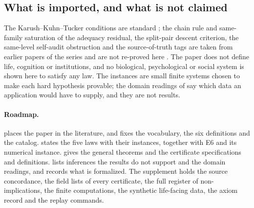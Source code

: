 \subsection{What is imported, and what is not claimed}\label{sec:intro-claims}

The Karush--Kuhn--Tucker conditions are standard \citep{BoydVandenberghe2004}; the chain rule and
same-family saturation of the adequacy residual, the split-pair descent criterion, the same-level
self-audit obstruction and the source-of-truth tags are taken from earlier papers of the series and
are not re-proved here \citep{Tsiokos2026Adequacy,Tsiokos2026FoundIV,Tsiokos2026FoundIII}. The
paper does not define life, cognition or institutions, and no biological, psychological or social
system is shown here to satisfy any law. The instances are small finite systems chosen to make each
hard hypothesis provable; the domain readings of  say which data an application
would have to supply, and they are not results.

\paragraph{Roadmap.}  places the paper in the literature, and 
fixes the vocabulary, the six definitions and the catalog.  states the five laws
with their instances, together with E6 and its numerical instance.  gives the general theorems and 
the certificate specifications and definitions.  lists inferences the results do not
support and the domain readings, and  records what is formalized.
The supplement holds the source
concordance, the field lists of every certificate, the full register of non-implications, the finite
computations, the synthetic life-facing data, the axiom record and the replay commands.
